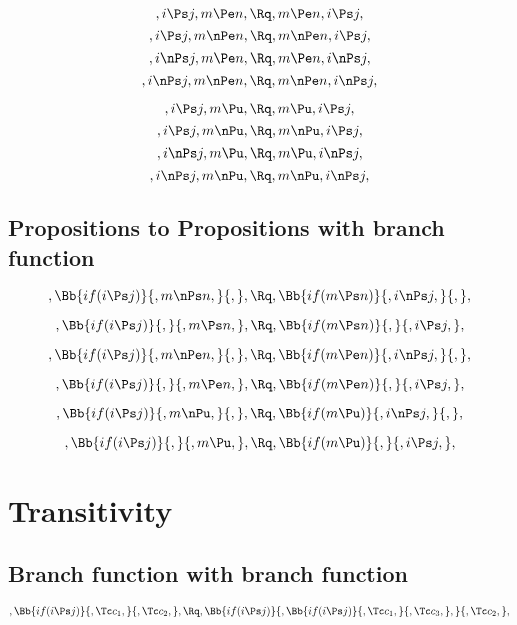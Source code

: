 \[,i \Ps j, m \Pe n, \Rq , m \Pe n, i \Ps j,\]
\[,i \Ps j, m \nPe n, \Rq , m \nPe n, i \Ps j,\]
\[,i \nPs j, m \Pe n, \Rq , m \Pe n, i \nPs j,\]
\[,i \nPs j, m \nPe n, \Rq , m \nPe n, i \nPs j,\]

\[,i \Ps j, m \Pu, \Rq , m \Pu, i \Ps j,\]
\[,i \Ps j, m \nPu, \Rq , m \nPu, i \Ps j,\]
\[,i \nPs j, m \Pu, \Rq , m \Pu, i \nPs j,\]
\[,i \nPs j, m \nPu, \Rq , m \nPu, i \nPs j,\]


\bigskip
\bigskip
\bigskip
\bigskip
\subsection{ Propositions to Propositions with branch function}
\[, \Bb{if(i \Ps j)}{,m \nPs n,}{,}, \Rq , \Bb{if(m \Ps n)}{,i \nPs j,}{,},\]

\bigskip
\bigskip
\[, \Bb{if(i \Ps j)}{,}{,m \Ps n,}, \Rq , \Bb{if(m \Ps n)}{,}{,i \Ps j,},\]

\bigskip
\bigskip
\[, \Bb{if(i \Ps j)}{,m \nPe n,}{,}, \Rq , \Bb{if(m \Pe n)}{,i \nPs j,}{,},\]

\bigskip
\bigskip
\[, \Bb{if(i \Ps j)}{,}{,m \Pe n,}, \Rq , \Bb{if(m \Pe n)}{,}{,i \Ps j,},\]

\bigskip
\bigskip
\[, \Bb{if(i \Ps j)}{,m \nPu,}{,}, \Rq , \Bb{if(m \Pu)}{,i \nPs j,}{,},\]

\bigskip
\bigskip
\[, \Bb{if(i \Ps j)}{,}{,m \Pu,}, \Rq , \Bb{if(m \Pu)}{,}{,i \Ps j,},\]

\bigskip
\bigskip
\bigskip
\bigskip
\section{Transitivity}
\subsection{Branch function with branch function}
\[, \Bb{if(i \Ps j)}{,\Tc c_1,}{,\Tc c_2,}, \Rq , \Bb{if(i \Ps j)}{,\Bb{if(i \Ps j)}{,\Tc c_1,}{,\Tc c_3,},}{,\Tc c_2,},\]

